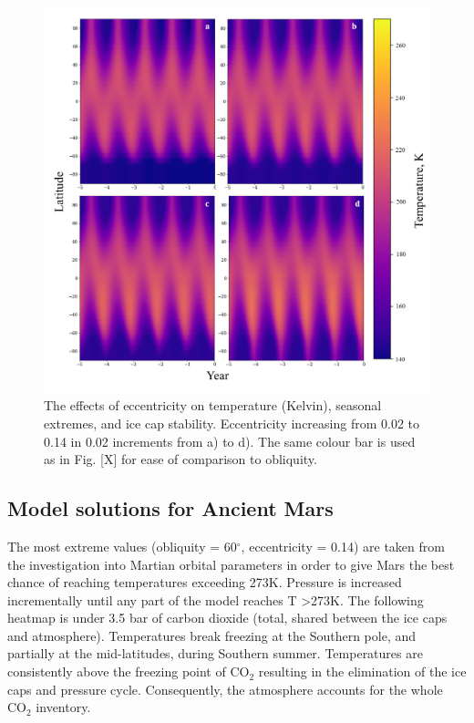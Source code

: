 \documentclass[12pt,onecolumn]{revtex4-2}    %
\begin{document}
\begin{figure}[h]
\centering
\includegraphics[width = 17cm]{eccentricity_heatmaps_new.png}
\caption{The effects of eccentricity on temperature (Kelvin), seasonal extremes, and ice cap stability. Eccentricity increasing from 0.02 to 0.14 in 0.02 increments from a) to d). The same colour bar is used as in Fig. [X] for ease of comparison to obliquity.}
\label{fig:test}
\end{figure}


\subsection{Model solutions for Ancient Mars}
The most extreme values (obliquity = 60$^{\circ}$, eccentricity = 0.14) are taken from the investigation into Martian orbital parameters in order to give Mars the best chance of reaching temperatures exceeding 273K. Pressure is increased incrementally until any part of the model reaches T \textgreater 273K. The following heatmap is under 3.5 bar of carbon dioxide (total, shared between the ice caps and atmosphere). Temperatures break freezing at the Southern pole, and partially at the mid-latitudes, during Southern summer. Temperatures are consistently above the freezing point of $\mathrm{CO_2}$ resulting in the elimination of the ice caps and pressure cycle. Consequently, the atmosphere accounts for the whole $\mathrm{CO_2}$ inventory.
\end{document}
